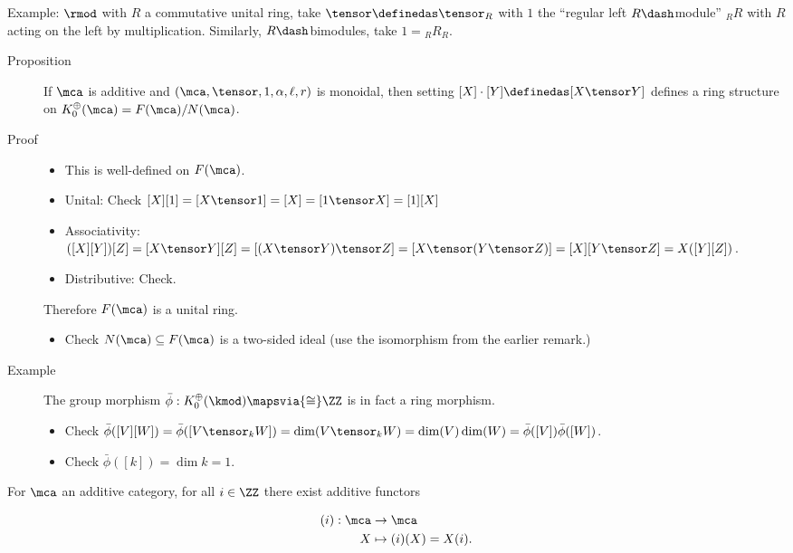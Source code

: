 Example: \(\rmod\) with \(R\) a commutative unital ring, take
\(\tensor \definedas \tensor_R\) with \(1\) the ``regular left
\(R\dash\)module'' \({}_R R\) with \(R\) acting on the left by
multiplication. Similarly, \(R\dash\)bimodules, take \(1 = {}_R R_R\).

\begin{description}
\item[Proposition]
If \(\mca\) is additive and \((\mca, \tensor, 1, \alpha, \ell, r)\) is
monoidal, then setting \([X] \cdot [Y] \definedas [X\tensor Y]\) defines
a ring structure on \(K_0^\oplus(\mca) = F(\mca) / N(\mca)\).
\item[Proof]
\hfill

\begin{itemize}
\tightlist
\item
  This is well-defined on \(F(\mca)\).
\item
  Unital: Check \([X][1] = [X\tensor 1] = [X] = [1\tensor X] = [1][X]\)
\item
  Associativity:
  \(([X][Y])[Z] = [X\tensor Y][Z] = [(X\tensor Y) \tensor Z] = [X\tensor (Y\tensor Z)] = [X][Y\tensor Z] = X([Y][Z])\).
\item
  Distributive: Check.
\end{itemize}

Therefore \(F(\mca)\) is a unital ring.

\begin{itemize}
\tightlist
\item
  Check \(N(\mca) \subseteq F(\mca)\) is a two-sided ideal (use the
  isomorphism from the earlier remark.)
\end{itemize}
\item[Example]
The group morphism \(\bar \phi: K_0^\oplus(\kmod) \mapsvia{\cong} \ZZ\)
is in fact a ring morphism.

\begin{itemize}
\tightlist
\item
  Check
  \(\bar \phi([V][W]) = \bar\phi([V\tensor_k W]) = \dim(V\tensor_k W)= \dim(V) \dim(W) = \bar\phi([V]) \bar\phi([W])\).
\item
  Check \(\bar\phi([k]) = \dim k = 1\).
\end{itemize}
\end{description}

For \(\mca\) an additive category, for all \(i\in \ZZ\) there exist
additive functors

\begin{align*}
(i): \mca &\to \mca \\
X &\mapsto (i)(X) = X(i)
.\end{align*}

